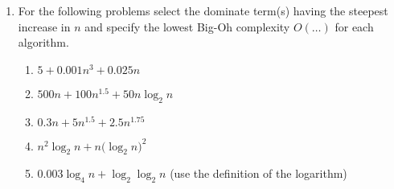 \documentclass[12pt]{article}
\begin{document}
\begin{enumerate}
\newpage
\item For the following problems select the dominate term(s) having the 
steepest increase in $n$ and specify the lowest Big-Oh complexity $O(\dots)$
for each algorithm.
\begin{enumerate}
\item $5+0.001n^3+0.025n$
\item $500n+100n^{1.5}+50n\log_2{n}$
\item $0.3n+5n^{1.5}+2.5n^{1.75}$
\item $n^2\log_2{n}+n(\log_2{n)^2}$
\item $0.003\log_4{n}+\log_2{\log_2{n}}$ (use the definition of the logarithm)
\end{enumerate}
\end{enumerate}
\end{document}
